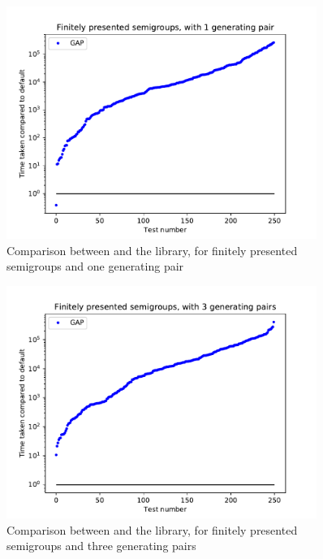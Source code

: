 \begin{figure}[p]
  \centering
  \includegraphics[width=0.9\textwidth]{pics/ch-pairs/bench-fp-1p-gap}
  \caption[Benchmark: \GAP{}/\libsemigroups{}, finitely presented, 1 pair]
  {Comparison between \libsemigroups{} and the \GAP{} library, for
    finitely presented semigroups and one generating pair}
  \label{fig:bench-fp-1p-gap}
\end{figure}

\begin{figure}[p]
  \centering
  \includegraphics[width=0.9\textwidth]{pics/ch-pairs/bench-fp-3p-gap}
  \caption[Benchmark: \GAP{}/\libsemigroups{}, finitely presented, 3 pairs]
  {Comparison between \libsemigroups{} and the \GAP{} library, for
    finitely presented semigroups and three generating pairs}
  \label{fig:bench-fp-3p-gap}
\end{figure}

